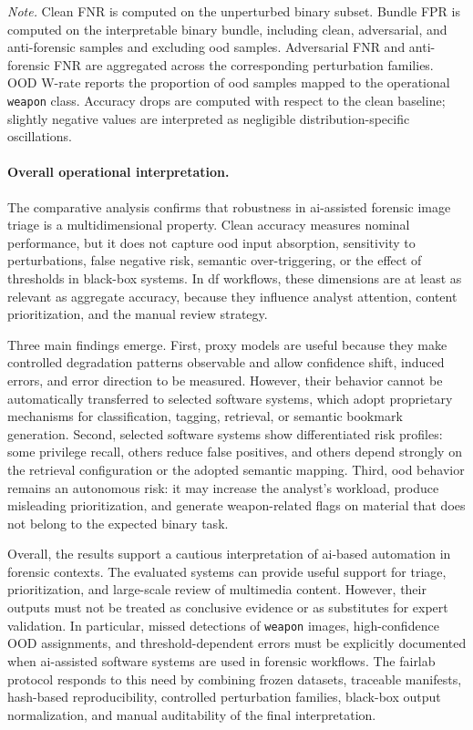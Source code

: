 \begin{flushleft}
\footnotesize
\textit{Note.} Clean FNR is computed on the unperturbed binary subset. Bundle
FPR is computed on the interpretable binary bundle, including clean,
adversarial, and anti-forensic samples and excluding \gls{ood} samples.
Adversarial FNR and anti-forensic FNR are aggregated across the corresponding
perturbation families. OOD W-rate reports the proportion of \gls{ood} samples
mapped to the operational \texttt{weapon} class. Accuracy drops are computed
with respect to the clean baseline; slightly negative values are interpreted as
negligible distribution-specific oscillations.
\end{flushleft}

\paragraph{Overall operational interpretation.}

The comparative analysis confirms that robustness in \gls{ai}-assisted forensic
image triage is a multidimensional property. Clean accuracy measures nominal
performance, but it does not capture \gls{ood} input absorption, sensitivity to
perturbations, false negative risk, semantic over-triggering, or the effect of
thresholds in black-box systems. In \gls{df} workflows, these dimensions are at
least as relevant as aggregate accuracy, because they influence analyst
attention, content prioritization, and the manual review strategy.

Three main findings emerge. First, proxy models are useful because they make
controlled degradation patterns observable and allow confidence shift, induced
errors, and error direction to be measured. However, their behavior cannot be
automatically transferred to selected software systems, which adopt proprietary
mechanisms for classification, tagging, retrieval, or semantic bookmark
generation. Second, selected software systems show differentiated risk
profiles: some privilege recall, others reduce false positives, and others
depend strongly on the retrieval configuration or the adopted semantic mapping.
Third, \gls{ood} behavior remains an autonomous risk: it may increase the
analyst's workload, produce misleading prioritization, and generate
weapon-related flags on material that does not belong to the expected binary
task.

Overall, the results support a cautious interpretation of \gls{ai}-based
automation in forensic contexts. The evaluated systems can provide useful
support for triage, prioritization, and large-scale review of multimedia
content. However, their outputs must not be treated as conclusive evidence or
as substitutes for expert validation. In particular, missed detections of
\texttt{weapon} images, high-confidence OOD assignments, and threshold-dependent
errors must be explicitly documented when \gls{ai}-assisted software systems
are used in forensic workflows. The \gls{fairlab} protocol responds to this
need by combining frozen datasets, traceable manifests, hash-based
reproducibility, controlled perturbation families, black-box output
normalization, and manual auditability of the final interpretation.

